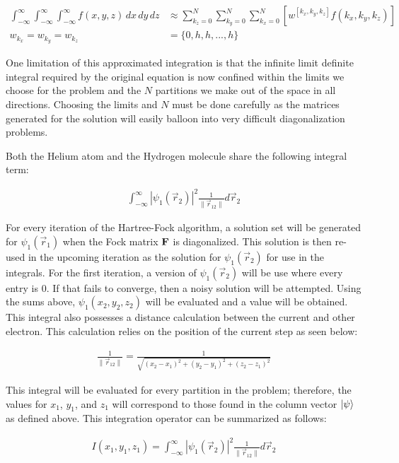 \documentclass[10pt, oneside, letterpaper]{article}
\begin{document}
\begin{align*}
  \int_{-\infty}^{\infty}\int_{-\infty}^{\infty}\int_{-\infty}^{\infty}f(x,y,z)\,dx\,dy\,dz &\approx \sum_{k_z=0}^N\sum_{k_y=0}^N\sum_{k_x=0}^N \left[w^{[k_x, k_y, k_z]}f(k_x, k_y, k_z)\right] \\
  w_{k_x} = w_{k_y} = w_{k_z} &= \{0, h, h, ..., h\}
\end{align*}

One limitation of this approximated integration is that the infinite limit definite integral required by the original equation is now confined within the limits we choose for the problem and the $N$ partitions we make out of the space in all directions. Choosing the limits and $N$ must be done carefully as the matrices generated for the solution will easily balloon into very difficult diagonalization problems.

Both the Helium atom and the Hydrogen molecule share the following integral term:

\begin{align*}
  \int_{-\infty}^{\infty}\left|\psi_1(\vec{r}_2)\right|^2\frac{1}{\|\vec{r}_{12}\|}d\vec{r}_2
\end{align*}

For every iteration of the Hartree-Fock algorithm, a solution set will be generated for $\psi_1(\vec{r}_1)$ when the Fock matrix $\bf{F}$ is diagonalized. This solution is then re-used in the upcoming iteration as the solution for $\psi_1(\vec{r}_2)$ for use in the integrals. For the first iteration, a version of $\psi_1(\vec{r}_2)$ will be use where every entry is 0. If that fails to converge, then a noisy solution will be attempted. Using the sums above, $\psi_1(x_2, y_2, z_2)$ will be evaluated and a value will be obtained. This integral also possesses a distance calculation between the current and other electron. This calculation relies on the position of the current step as seen below:

\begin{align*}
  \frac{1}{\|\vec{r}_{12}\|} = \frac{1}{\sqrt{(x_2-x_1)^2 + (y_2-y_1)^2 + (z_2-z_1)^2}}
\end{align*}

This integral will be evaluated for every partition in the problem; therefore, the values for $x_1$, $y_1$, and $z_1$ will correspond to those found in the column vector $\ket{\psi}$ as defined above. This integration operator can be summarized as follows:

\begin{align*}
  I(x_1, y_1, z_1) = \int_{-\infty}^{\infty}\left|\psi_1(\vec{r}_2)\right|^2\frac{1}{\|\vec{r}_{12}\|}d\vec{r}_2
\end{align*}
\end{document}
